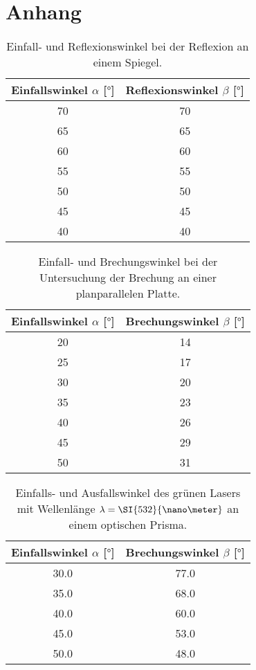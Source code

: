 \section{Anhang}

\begin{table}
    \caption{Einfall- und Reflexionswinkel bei der Reflexion an einem Spiegel.}
    \centering
    \label{tab:reflexion}
    \begin{tabular}{c c}
        \toprule
        Einfallswinkel $\alpha$ [$\si{\degree}$] & Reflexionswinkel $\beta$ [$\si{\degree}$] \\
        \midrule
        70 & 70 \\
        65 & 65 \\
        60 & 60 \\
        55 & 55 \\
        50 & 50 \\
        45 & 45 \\
        40 & 40 \\
        \bottomrule    
    \end{tabular}
\end{table}

\begin{table}
    \caption{Einfall- und Brechungswinkel bei der Untersuchung der Brechung an einer planparallelen Platte.}
    \centering
    \label{tab:brechung}
    \begin{tabular}{c c}
        \toprule
        Einfallswinkel $\alpha$ [$\si{\degree}$] & Brechungswinkel $\beta$ [$\si{\degree}$] \\
        \midrule
        20 & 14 \\
        25 & 17 \\
        30 & 20 \\
        35 & 23 \\
        40 & 26 \\
        45 & 29 \\
        50 & 31 \\
        \bottomrule    
    \end{tabular}
\end{table}

\begin{table}
    \caption{Einfalls- und Ausfallswinkel des grünen Lasers mit Wellenlänge $\protect \lambda = \SI{532}{\nano\meter}$ an einem optischen Prisma.}
    \centering
    \label{tab:prismagreen}
    \begin{tabular}{c c}
        \toprule
        Einfallswinkel $\alpha$ [$\si{\degree}$] & Brechungswinkel $\beta$ [$\si{\degree}$] \\
        \midrule
        30.0 & 77.0 \\
        35.0 & 68.0 \\
        40.0 & 60.0 \\
        45.0 & 53.0 \\
        50.0 & 48.0 \\
        \bottomrule    
    \end{tabular}
\end{table}

